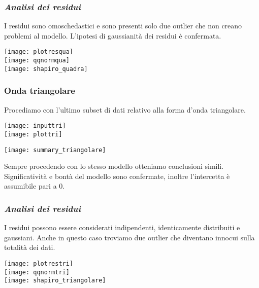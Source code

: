 \documentclass[a4paper]{article}
\begin{document}
	\subsubsection*{\textit{Analisi dei residui}}
I residui sono omoschedastici e sono presenti solo due outlier che non creano problemi al modello. L’ipotesi di gaussianità dei residui è confermata.
	\begin{center}
		\texttt{[image: plotresqua]} 
		\bigskip \\
		
		\texttt{[image: qqnormqua]} 
		\bigskip \\
		\bigskip
		\texttt{[image: shapiro\_quadra]} 
	\end{center}
	
	\newpage
	\subsubsection{Onda triangolare}
	Procediamo con l’ultimo subset di dati relativo alla forma d’onda triangolare.
	\bigskip 
	\bigskip 
	\begin{center}
		
		\texttt{[image: inputtri]} 
		\bigskip \\
		\texttt{[image: plottri]}
	\end{center}
	
	\begin{center}
		
		\texttt{[image: summary\_triangolare]} 
		
	\end{center}
	Sempre procedendo con lo stesso modello otteniamo conclusioni simili. Significatività e bontà del modello sono confermate, inoltre l'intercetta è assumibile pari a $0$.
	
	\subsubsection*{\textit{Analisi dei residui}}
	I residui possono essere considerati indipendenti, identicamente distribuiti e gaussiani. Anche in questo caso troviamo due outlier che diventano innocui sulla totalità dei dati.
	\begin{center}
		\texttt{[image: plotrestri]} 
		\bigskip \\
		\texttt{[image: qqnormtri]} 
		\bigskip \\
		\texttt{[image: shapiro\_triangolare]} 
	\end{center}
	
\end{document}
